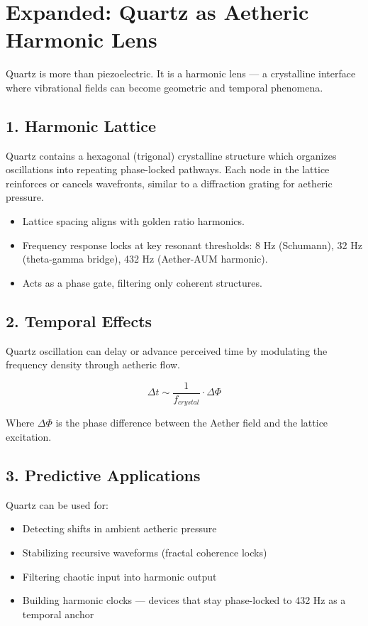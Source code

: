 
\section*{Expanded: Quartz as Aetheric Harmonic Lens}

Quartz is more than piezoelectric. It is a harmonic lens — a crystalline interface where vibrational fields can become geometric and temporal phenomena.

\subsection*{1. Harmonic Lattice}

Quartz contains a hexagonal (trigonal) crystalline structure which organizes oscillations into repeating phase-locked pathways. Each node in the lattice reinforces or cancels wavefronts, similar to a diffraction grating for aetheric pressure.

\begin{itemize}
    \item Lattice spacing aligns with golden ratio harmonics.
    \item Frequency response locks at key resonant thresholds: 8 Hz (Schumann), 32 Hz (theta-gamma bridge), 432 Hz (Aether-AUM harmonic).
    \item Acts as a phase gate, filtering only coherent structures.
\end{itemize}

\subsection*{2. Temporal Effects}

Quartz oscillation can delay or advance perceived time by modulating the frequency density through aetheric flow.

\[
\Delta t \sim \frac{1}{f_{crystal}} \cdot \Delta \Phi
\]

Where \( \Delta \Phi \) is the phase difference between the Aether field and the lattice excitation.

\subsection*{3. Predictive Applications}

Quartz can be used for:
\begin{itemize}
    \item Detecting shifts in ambient aetheric pressure
    \item Stabilizing recursive waveforms (fractal coherence locks)
    \item Filtering chaotic input into harmonic output
    \item Building harmonic clocks — devices that stay phase-locked to 432 Hz as a temporal anchor
\end{itemize}


